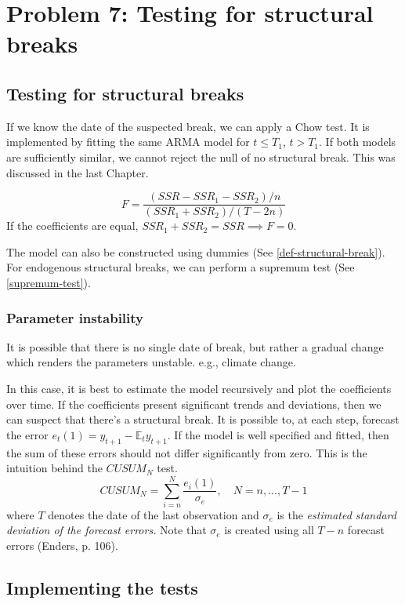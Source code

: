 \documentclass[11pt, a4paper]{report}
\theoremstyle{plain}
\theoremstyle{plain}
\theoremstyle{remark}
\begin{document}
\chapter{Problem 7: Testing for structural breaks}


\section{Testing for structural breaks}

If we know the date of the suspected break, we can apply a Chow test. It is implemented by fitting the same ARMA model for $t \leq T_1$, $t > T_1$. If both models are sufficiently similar, we cannot reject the null of no structural break. This was discussed in the last Chapter.

$$ F = \dfrac{(SSR - SSR_1 - SSR_2)/n}{(SSR_1 + SSR_2)/(T-2n)} $$
If the coefficients are equal, $SSR_1 + SSR_2 = SSR \implies F = 0$.

The model can also be constructed using dummies (See \ref{def-structural-break}). For endogenous structural breaks, we can perform a supremum test (See \ref{supremum-test}).

\subsection{Parameter instability}

It is possible that there is no single date of break, but rather a gradual change which renders the parameters unstable. e.g., climate change. 

In this case, it is best to estimate the model recursively and plot the coefficients over time. If the coefficients present significant trends and deviations, then we can suspect that there's a structural break. It is possible to, at each step, forecast the error $e_t(1) = y_{t+1} - \mathbb{E}_t y_{t+1}$. If the model is well specified and fitted, then the sum of these errors should not differ significantly from zero. This is the intuition behind the $CUSUM_N$ test.
$$ CUSUM_N = \sum_{i=n}^{N} \dfrac{e_i(1)}{\sigma_e}, \hspace{1em} N = n, ..., T-1 $$
where $T$ denotes the date of the last observation and $\sigma_e$ is the \textit{estimated standard deviation of the forecast errors.} Note that $\sigma_e$ is created using all $T-n$ forecast errors (Enders, p. 106).

\section{Implementing the tests}
\end{document}
